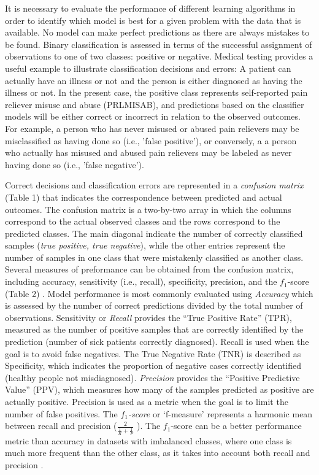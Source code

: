 \documentclass[sigconf]{acmart}
\begin{document}
It is necessary to evaluate the performance of different learning algorithms
in order to identify which model is best for a given problem with the data 
that is available. No model can make perfect predictions as there are always 
mistakes to be found. Binary classification is assessed in terms of the 
successful assignment of observations to one of two classes: positive or 
negative. Medical testing provides a useful example to illustrate 
classification decisions and errors: A patient can actually have an illness 
or not and the person is either diagnosed as having the illness or not. In 
the present case, the positive class represents self-reported pain reliever 
misuse and abuse (PRLMISAB), and predictions based on the classifier models 
will be either correct or incorrect in relation to the observed outcomes. 
For example, a person who has never misused or abused pain relievers may be 
misclassified as having done so (i.e., 'false positive'), or conversely, a 
a person who actually has misused and abused pain relievers may be labeled 
as never having done so (i.e., 'false negative').


Correct decisions and classification errors are represented in a 
\emph{confusion matrix} (Table 1) that indicates the correspondence between 
predicted and actual outcomes. The confusion matrix is a two-by-two array in 
which the columns correspond to the actual observed classes and the rows 
correspond to the predicted classes. The main diagonal indicate the number of 
correctly classified samples (\emph{true positive, true negative}), while the 
other entries represent the number of samples in one class that were mistakenly 
classified as another class. Several measures of preformance can be obtained
from the confusion matrix, including accuracy, sensitivity (i.e., recall), 
specificity, precision, and the $f_1$-score (Table 2) \cite{kuhn13, wiki18}. 
Model performance is most commonly evaluated using \emph{Accuracy} which is 
assessed by the number of correct predictions divided by the total number 
of observations. Sensitivity or \emph{Recall} provides the ``True Positive 
Rate'' (TPR), measured as the number of positive samples that are correctly 
identified by the prediction (number of sick patients correctly diagnosed). 
Recall is used when the goal is to avoid false negatives. The True Negative 
Rate (TNR) is described as Specificity, which indicates the proportion of 
negative cases correctly identified (healthy people not misdiagnosed). 
\emph{Precision} provides the ``Positive Predictive Value'' (PPV), which 
measures how many of the samples predicted as positive are actually positive. 
Precision is used as a metric when the goal is to limit the number of false 
positives. The \emph{$f_1$-score} or `f-measure' represents a harmonic mean 
between recall and precision (\(\frac{2}{ \frac{1}{R} + \frac{1}{P} }\) ).
The $f_1$-score can be a better performance metric than accuracy 
in datasets with imbalanced classes, where one class is much more frequent 
than the other class, as it takes into account both recall and precision 
\cite{muller17, yun09}.
\end{document}
